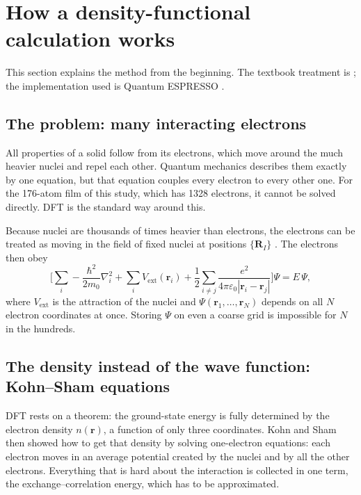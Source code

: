 \section{How a density-functional calculation works}
\label{sec:dft-theory}

This section explains the method from the beginning. The textbook treatment is \citet{Martin2004}; the
implementation used is Quantum ESPRESSO \citep{Giannozzi2009,Giannozzi2017}.

\subsection{The problem: many interacting electrons}
\label{sec:dft-problem}

\begin{dftplain}
All properties of a solid follow from its electrons, which move around the much heavier nuclei and repel each other.
Quantum mechanics describes them exactly by one equation, but that equation couples every electron to every other one.
For the 176-atom film of this study, which has 1328 electrons, it cannot be solved directly. DFT is the standard way
around this.
\end{dftplain}

Because nuclei are thousands of times heavier than electrons, the electrons can be treated as moving in the field of
fixed nuclei at positions $\{\mathbf{R}_I\}$ \citep{Born1927}. The electrons then obey
\begin{equation}
\Big[\sum_i -\frac{\hbar^2}{2m_0}\nabla_i^2 + \sum_i V_{\mathrm{ext}}(\mathbf{r}_i)
+ \frac{1}{2}\sum_{i\neq j}\frac{e^2}{4\pi\varepsilon_0|\mathbf{r}_i-\mathbf{r}_j|}\Big]\Psi = E\,\Psi ,
\label{eq:dft-manybody}
\end{equation}
where $V_{\mathrm{ext}}$ is the attraction of the nuclei and $\Psi(\mathbf{r}_1,\ldots,\mathbf{r}_N)$ depends on all $N$
electron coordinates at once. Storing $\Psi$ on even a coarse grid is impossible for $N$ in the hundreds.

\subsection{The density instead of the wave function: Kohn--Sham equations}
\label{sec:dft-ks}

\begin{dftplain}
DFT rests on a theorem: the ground-state energy is fully determined by the electron density $n(\mathbf{r})$, a function
of only three coordinates. Kohn and Sham then showed how to get that density by solving one-electron equations: each
electron moves in an average potential created by the nuclei and by all the other electrons. Everything that is hard
about the interaction is collected in one term, the exchange--correlation energy, which has to be approximated.
\end{dftplain}

